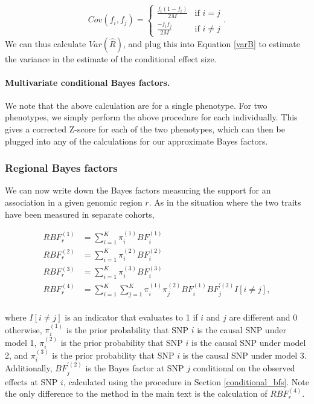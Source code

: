 \documentclass[11pt,titlepage]{article}
\begin{document}
\begin{equation}
Cov(f_i, f_j) =
  \begin{cases}
   \frac{f_i (1-f_i)}{2M} & \text{if } i = j \\
   \frac{- f_i f_j}{2M}       & \text{if } i \ne j
  \end{cases}.
\end{equation}
We can thus calculate $Var(\hat R)$, and plug this into Equation \ref{varB} to estimate the variance in the estimate of the conditional effect size. 
\paragraph{Multivariate conditional Bayes factors.} We note that the above calculation are for a single phenotype. For two phenotypes, we simply perform the above procedure for each individually. This gives a corrected Z-score for each of the two phenotypes, which can then be plugged into any of the calculations for our approximate Bayes factors. 

\subsubsection{Regional Bayes factors}
We can now write down the Bayes factors measuring the support for an association in a given genomic region $r$. As in the situation where the two traits have been measured in separate cohorts,

\begin{align}
RBF_r^{(1)} &= \sum \limits_{i = 1}^{K} \pi_i^{(1)} BF_i^{(1)}\\
RBF_r^{(2)}  &= \sum \limits_{i = 1}^{K} \pi_i^{(2)} BF_i^{(2)} \\
RBF_r^{(3)}  &= \sum \limits_{i = 1}^{K} \pi_i^{(3)} BF_i^{(3)} \\
RBF_r^{(4)}  &= \sum \limits_{i = 1}^{K} \sum \limits_{j = 1}^K \pi_i^{(1)} \pi_j^{(2)}  BF_i^{(1)} BF_j^{\prime(2)} I[i \ne j ],\\
\end{align} 

\noindent where $I[i \ne j]$ is an indicator that evaluates to 1 if $i$ and $j$ are different and 0 otherwise,  $\pi_i^{(1)}$ is the prior probability that SNP $i$ is the causal SNP under model 1, $\pi_i^{(2)}$ is the prior probability that SNP $i$ is the causal SNP under model 2, and $\pi_i^{(3)}$ is the prior probability that SNP $i$ is the causal SNP under model 3. Additionally, $BF_j^{\prime(2)}$ is the Bayes factor at SNP $j$ conditional on the observed effects at SNP $i$, calculated using the procedure in Section \ref{conditional_bfs}. Note the only difference to the method in the main text is the calculation of $RBF_r^{(4)}$.
\end{document}
